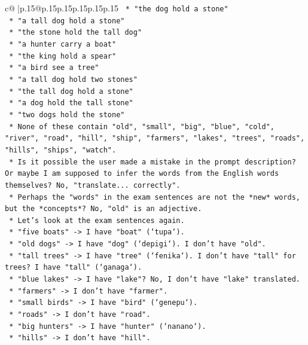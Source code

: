\documentclass{article}
\begin{document}
{\begin{supertabular}{c@{$\;$}|p{.15\linewidth}@{}p{.15\linewidth}p{.15\linewidth}p{.15\linewidth}p{.15\linewidth}p{.15\linewidth}}
{{{\texttt{        *   "the dog hold a stone"} \\
\texttt{        *   "a tall dog hold a stone"} \\
\texttt{        *   "the stone hold the tall dog"} \\
\texttt{        *   "a hunter carry a boat"} \\
\texttt{        *   "the king hold a spear"} \\
\texttt{        *   "a bird see a tree"} \\
\texttt{        *   "a tall dog hold two stones"} \\
\texttt{        *   "the tall dog hold a stone"} \\
\texttt{        *   "a dog hold the tall stone"} \\
\texttt{        *   "two dogs hold the stone"} \\
\texttt{    *   None of these contain "old", "small", "big", "blue", "cold", "river", "road", "hill", "ship", "farmers", "lakes", "trees", "roads", "hills", "ships", "watch".} \\
\texttt{    *   Is it possible the user made a mistake in the prompt description? Or maybe I am supposed to infer the words from the English words themselves? No, "translate... correctly".} \\
\texttt{    *   Perhaps the "words" in the exam sentences are not the *new* words, but the *concepts*? No, "old" is an adjective.} \\
\texttt{    *   Let's look at the exam sentences again.} \\
\texttt{        *   "five boats" {-}> I have "boat" (`tupa`).} \\
\texttt{        *   "old dogs" {-}> I have "dog" (`depigi`). I don't have "old".} \\
\texttt{        *   "tall trees" {-}> I have "tree" (`fenika`). I don't have "tall" for trees? I have "tall" (`ganaga`).} \\
\texttt{        *   "blue lakes" {-}> I have "lake"? No, I don't have "lake" translated.} \\
\texttt{        *   "farmers" {-}> I don't have "farmer".} \\
\texttt{        *   "small birds" {-}> I have "bird" (`genepu`).} \\
\texttt{        *   "roads" {-}> I don't have "road".} \\
\texttt{        *   "big hunters" {-}> I have "hunter" (`nanano`).} \\
\texttt{        *   "hills" {-}> I don't have "hill".} \\
}}}
\end{supertabular}}
\end{document}
